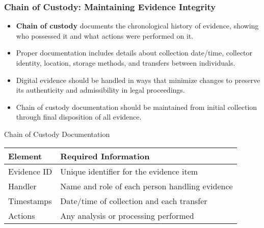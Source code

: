 \documentclass{beamer}
\begin{document}
\begin{frame}
\scriptsize
\frametitle{Chain of Custody: Maintaining Evidence Integrity}
\begin{itemize}
\item \textbf{Chain of custody} documents the chronological history of evidence, showing who possessed it and what actions were performed on it.
\item Proper documentation includes details about collection date/time, collector identity, location, storage methods, and transfers between individuals.
\item Digital evidence should be handled in ways that minimize changes to preserve its authenticity and admissibility in legal proceedings.
\item Chain of custody documentation should be maintained from initial collection through final disposition of all evidence.
\end{itemize}

\begin{exampleblock}{Chain of Custody Documentation}
\scriptsize
\begin{center}
\begin{tabular}{|l|l|}
\hline
\textbf{Element} & \textbf{Required Information} \\
\hline
Evidence ID & Unique identifier for the evidence item \\
Handler & Name and role of each person handling evidence \\
Timestamps & Date/time of collection and each transfer \\
Actions & Any analysis or processing performed \\
\hline
\end{tabular}
\end{center}
\end{exampleblock}
\end{frame}
\end{document}

